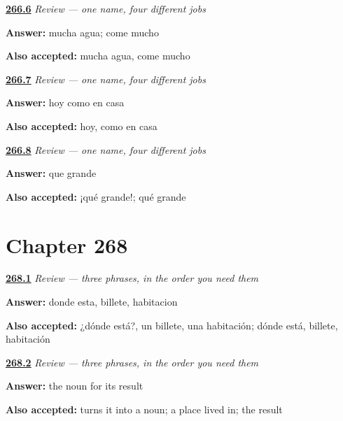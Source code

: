 \noindent\begin{minipage}[t]{\linewidth}
\raggedright
\hyperlink{review-ES-C67-repaso-lo-que-reemplazo-los-casos-cuantificador}{\textbf{266.6}} \emph{Review — one name, four different jobs}\par
\small \textbf{Answer:} mucha agua; come mucho\par
\footnotesize \textbf{Also accepted:} mucha agua, come mucho
\end{minipage}\par\medskip

\noindent\begin{minipage}[t]{\linewidth}
\raggedright
\hyperlink{review-ES-C67-repaso-lo-que-reemplazo-los-casos-orden}{\textbf{266.7}} \emph{Review — one name, four different jobs}\par
\small \textbf{Answer:} hoy como en casa\par
\footnotesize \textbf{Also accepted:} hoy, como en casa
\end{minipage}\par\medskip

\noindent\begin{minipage}[t]{\linewidth}
\raggedright
\hyperlink{review-ES-C67-repaso-lo-que-reemplazo-los-casos-que}{\textbf{266.8}} \emph{Review — one name, four different jobs}\par
\small \textbf{Answer:} que grande\par
\footnotesize \textbf{Also accepted:} ¡qué grande!; qué grande
\end{minipage}\par\medskip

\section*{Chapter 268}

\noindent\begin{minipage}[t]{\linewidth}
\raggedright
\hyperlink{review-ES-C268-repaso-llegar-y-quedarse-orden}{\textbf{268.1}} \emph{Review — three phrases, in the order you need them}\par
\small \textbf{Answer:} donde esta, billete, habitacion\par
\footnotesize \textbf{Also accepted:} ¿dónde está?, un billete, una habitación; dónde está, billete, habitación
\end{minipage}\par\medskip

\noindent\begin{minipage}[t]{\linewidth}
\raggedright
\hyperlink{review-ES-C268-repaso-llegar-y-quedarse-cion}{\textbf{268.2}} \emph{Review — three phrases, in the order you need them}\par
\small \textbf{Answer:} the noun for its result\par
\footnotesize \textbf{Also accepted:} turns it into a noun; a place lived in; the result
\end{minipage}\par\medskip

